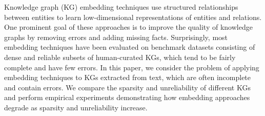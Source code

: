 Knowledge graph (KG) embedding techniques use structured relationships between entities to learn low-dimensional representations of entities and relations. One prominent goal of these approaches is to improve the quality of knowledge graphs by removing errors and adding missing facts. Surprisingly, most embedding techniques have been evaluated on benchmark datasets consisting of dense and reliable subsets of human-curated KGs, which tend to be fairly complete and have few errors. In this paper, we consider the problem of applying embedding techniques to KGs extracted from text, which are often incomplete and contain errors. We compare the sparsity and unreliability of different KGs and perform empirical experiments demonstrating how embedding approaches degrade as sparsity and unreliability increase.
